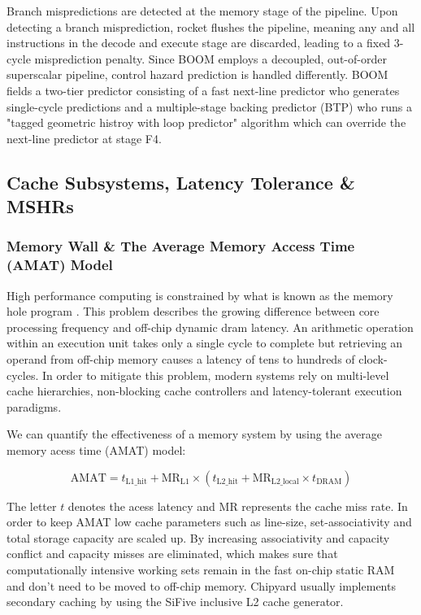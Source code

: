 \begin{itemize}
    Branch mispredictions are detected at the memory stage of the pipeline. 
    Upon detecting a branch misprediction, rocket flushes the pipeline, meaning any and all instructions in the decode and execute stage are discarded,
    leading to a fixed 3-cycle misprediction penalty.
    Since BOOM employs a decoupled, out-of-order superscalar pipeline, control hazard prediction is handled differently.
    BOOM fields a two-tier predictor consisting of a fast next-line predictor who generates single-cycle predictions
    and a multiple-stage backing predictor (BTP) who runs a "tagged geometric histroy with loop predictor" algorithm  which can override the next-line predictor at stage F4.
  \end{itemize}


\subsection{Cache Subsystems, Latency Tolerance \& MSHRs}

\subsubsection{Memory Wall \& The Average Memory Access Time (AMAT) Model}

High performance computing is constrained by what is known as the memory hole program \cite{wulf1995memory}.
This problem describes the growing difference between core processing frequency and off-chip dynamic dram latency.
An arithmetic operation within an execution unit takes only a single cycle to complete but retrieving an operand from off-chip memory causes a latency of tens to hundreds of clock-cycles.
In order to mitigate this problem, modern systems rely on multi-level cache hierarchies, non-blocking cache controllers and latency-tolerant execution paradigms.

We can quantify the effectiveness of a memory system by using the average memory acess time (AMAT) model: 

\begin{equation}
  \text{AMAT} = t_{\text{L1\_hit}} + \text{MR}_{\text{L1}} \times \left( t_{\text{L2\_hit}} + \text{MR}_{\text{L2\_local}} \times t_{\text{DRAM}} \right)
\end{equation}

The letter $t$ denotes the acess latency and MR represents the cache miss rate.
In order to keep AMAT low cache parameters such as line-size, set-associativity and total storage capacity are scaled up.
By increasing associativity and capacity conflict and capacity misses are eliminated,
which makes sure that computationally intensive working sets remain in the fast on-chip static RAM and don't need to be moved to off-chip memory.
Chipyard usually implements secondary caching by using the SiFive inclusive L2 cache generator.

